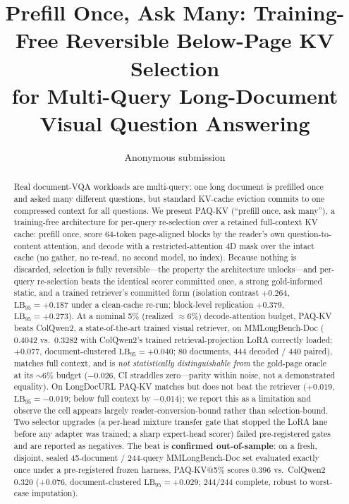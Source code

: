 \documentclass[letterpaper]{article} %
\title{Prefill Once, Ask Many: Training-Free Reversible Below-Page KV Selection\\for Multi-Query Long-Document Visual Question Answering}
\author{
    Anonymous submission
}
\newcommand{\paqc}{\textsc{PAQ-KV}}
\newcommand{\lb}{\mathrm{LB}_{95}}
\begin{document}
\maketitle

\begin{abstract}
Real document-VQA workloads are multi-query: one long document is prefilled once and asked many different questions, but standard KV-cache eviction commits to one compressed context for all questions. We present \paqc{} (``prefill once, ask many''), a training-free architecture for per-query re-selection over a retained full-context KV cache: prefill once, score 64-token page-aligned blocks by the reader's own question-to-content attention, and decode with a restricted-attention 4D mask over the intact cache (no gather, no re-read, no second model, no index). Because nothing is discarded, selection is fully reversible---the property the architecture unlocks---and per-query re-selection beats the identical scorer committed once, a strong gold-informed static, and a trained retriever's committed form (isolation contrast $+0.264$, $\lb=+0.187$ under a clean-cache re-run; block-level replication $+0.379$, $\lb=+0.273$). At a nominal 5\% (realized ${\approx}6\%$) decode-attention budget, \paqc{} beats ColQwen2, a state-of-the-art trained visual retriever, on MMLongBench-Doc ($0.4042$ vs.\ $0.3282$ with ColQwen2's trained retrieval-projection LoRA correctly loaded; $+0.077$, document-clustered $\lb=+0.040$; 80 documents, 444 decoded / 440 paired), matches full context, and is \emph{not statistically distinguishable from} the gold-page oracle at its ${\sim}6\%$ budget ($-0.026$, CI straddles zero---parity within noise, not a demonstrated equality). On LongDocURL \paqc{} matches but does not beat the retriever ($+0.019$, $\lb=-0.019$; below full context by $-0.014$); we report this as a limitation and observe the cell appears largely reader-conversion-bound rather than selection-bound. Two selector upgrades (a per-head mixture transfer gate that stopped the LoRA lane before any adapter was trained; a sharp expert-head scorer) failed pre-registered gates and are reported as negatives. The beat is \textbf{confirmed out-of-sample}: on a fresh, disjoint, sealed 45-document / 244-query MMLongBench-Doc set evaluated exactly once under a pre-registered frozen harness, \paqc{}@5\% scores $0.396$ vs.\ ColQwen2 $0.320$ ($+0.076$, document-clustered $\lb=+0.029$; $244/244$ complete, robust to worst-case imputation).
\end{abstract}
\end{document}
